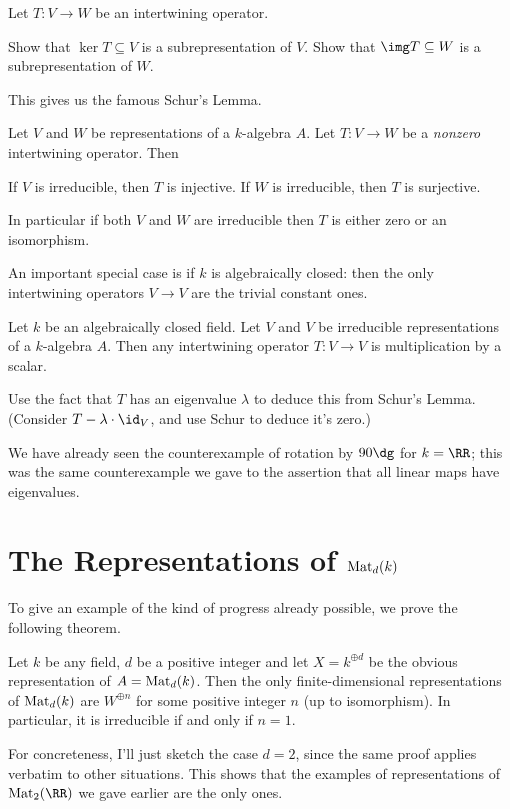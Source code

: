 \documentclass[11pt]{scrreprt}
\begin{document}
\begin{exercise}
	Let $T : V \to W$ be an intertwining operator.
	\begin{enumerate}[(a)]
		\ii Show that $\ker T \subseteq V$ is a subrepresentation of $V$.
		\ii Show that $\img T \subseteq W$ is a subrepresentation of $W$.
	\end{enumerate}
\end{exercise}

This gives us the famous Schur's Lemma.
\begin{theorem}
	Let $V$ and $W$ be representations of a $k$-algebra $A$.
	Let $T : V \to W$ be a \emph{nonzero} intertwining operator.
	Then
	\begin{enumerate}[(a)]
		\ii If $V$ is irreducible, then $T$ is injective.
		\ii If $W$ is irreducible, then $T$ is surjective.
	\end{enumerate}
	In particular if both $V$ and $W$ are irreducible then $T$
	is either zero or an isomorphism.
\end{theorem}
An important special case is if $k$ is algebraically closed:
then the only intertwining operators $V \to V$
are the trivial constant ones.
\begin{theorem}
	Let $k$ be an algebraically closed field.
	Let $V$ and $V$ be irreducible representations of a $k$-algebra $A$.
	Then any intertwining operator $T : V \to V$ is multiplication by a scalar.
\end{theorem}
\begin{exercise}
	Use the fact that $T$ has an eigenvalue $\lambda$ to
	deduce this from Schur's Lemma.
	(Consider $T - \lambda \cdot \id_V$, and use Schur to deduce it's zero.)
\end{exercise}
We have already seen the counterexample of rotation by $90\dg$ for $k = \RR$;
this was the same counterexample we gave to the assertion that all linear maps
have eigenvalues.

\section{The Representations of $\mathrm{Mat}_d(k)$}
To give an example of the kind of progress already possible,
we prove the following theorem.
\begin{theorem}
	\label{thm:rep_1mat}
	Let $k$ be any field, $d$ be a positive integer and
	let $X = k^{\oplus d}$ be the obvious representation of $A = \mathrm{Mat}_d(k)$.
	Then the only finite-dimensional representations
	of $\mathrm{Mat}_d(k)$ are $W^{\oplus n}$
	for some positive integer $n$ (up to isomorphism).
	In particular, it is irreducible if and only if $n=1$.
\end{theorem}
For concreteness, I'll just sketch the case $d=2$,
since the same proof applies verbatim to other situations.
This shows that the examples of representations of $\Mat_2(\RR)$
we gave earlier are the only ones.
\end{document}
